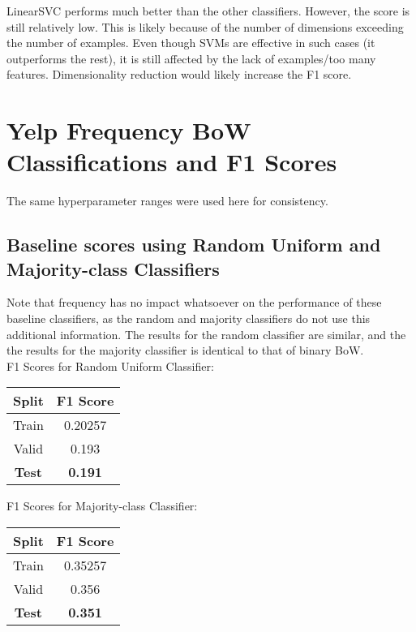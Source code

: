 \documentclass{article}
\begin{document}
LinearSVC performs much better than the other classifiers. However, the score is still relatively low. This is likely because of the number of dimensions exceeding the number of examples. Even though SVMs are effective in such cases (it outperforms the rest), it is still affected by the lack of examples/too many features. Dimensionality reduction would likely increase the F1 score.

\newpage

\section{Yelp Frequency BoW Classifications and F1 Scores}
The same hyperparameter ranges were used here for consistency.

\subsection{Baseline scores using Random Uniform and Majority-class Classifiers}
Note that frequency has no impact whatsoever on the performance of these baseline classifiers, as the random and majority classifiers do not use this additional information. The results for the random classifier are similar, and the the results for the majority classifier is identical to that of binary BoW. \\

F1 Scores for Random Uniform Classifier:
\begin{center}
\begin{tabular}{ |c|c| } 
	\hline
	\textbf{Split} & \textbf{F1 Score} \\ 
	\hline
	Train & 0.20257 \\
	Valid & 0.193 \\ 
	\textbf{Test} & \textbf{0.191} \\
	\hline
\end{tabular}
\end{center}

F1 Scores for Majority-class Classifier:
\begin{center}
\begin{tabular}{ |c|c| } 
	\hline
	\textbf{Split} & \textbf{F1 Score} \\ 
	\hline
	Train & 0.35257 \\
	Valid & 0.356 \\ 
	\textbf{Test} & \textbf{0.351} \\
	\hline
\end{tabular}
\end{center}
\end{document}
